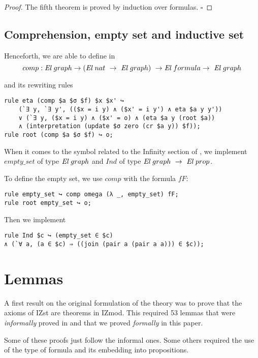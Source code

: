 \documentclass[a4paper]{article}
\begin{document}
\begin{proof}
The fifth theorem is proved by induction over formulas. $\square$
\end{proof}

\subsection{Comprehension, empty set and inductive set}

Henceforth, we are able to define in \dedukti
$$comp : \El~graph \ra (\El \ nat \ \ra \ \El~graph) \  \ra \El \ formula \ra \ \El~graph$$

and its rewriting rules

\begin{lstlisting}
rule eta (comp $a $σ $f) $x $x' ↪ 
	(`∃ y, `∃ y', (($x = i y) ∧ ($x' = i y') ∧ eta $a y y')) 
	∨ (`∃ y, ($x = i y) ∧ ($x' = o) ∧ (eta $a y (root $a))
	∧ (interpretation (update $σ zero (cr $a y)) $f));
rule root (comp $a $σ $f) ↪ o;
\end{lstlisting}

When it comes to the symbol related to the Infinity section of \cite[see][Section 2.1]{zermodulo}, we implement $empty\_set$ of type ${\mbox{\it El}}~graph$ and $Ind$ of type $\El~graph \ \ra \ \El~prop$.

To define the empty set, we use $comp$ with the formula $fF$:
\begin{lstlisting}
rule empty_set ↪ comp omega (λ _, empty_set) fF;
rule root empty_set ↪ o;
\end{lstlisting}

Then we implement

\begin{lstlisting}
rule Ind $c ↪ (empty_set ∈ $c) 
∧ (`∀ a, (a ∈ $c) ⇒ ((join (pair a (pair a a))) ∈ $c));
\end{lstlisting}


\section{Lemmas}

A first result on the original formulation of the theory was to prove that the axioms of IZst are theorems in IZmod. This required 53 lemmas that were \textit{informally} proved in \cite[see][Tables 4 and 5]{zermodulo} and that we proved \textit{formally} in this paper.

Some of these proofs just follow the informal ones. Some others required the use of the type of formula and its embedding into propositions. 
\end{document}
